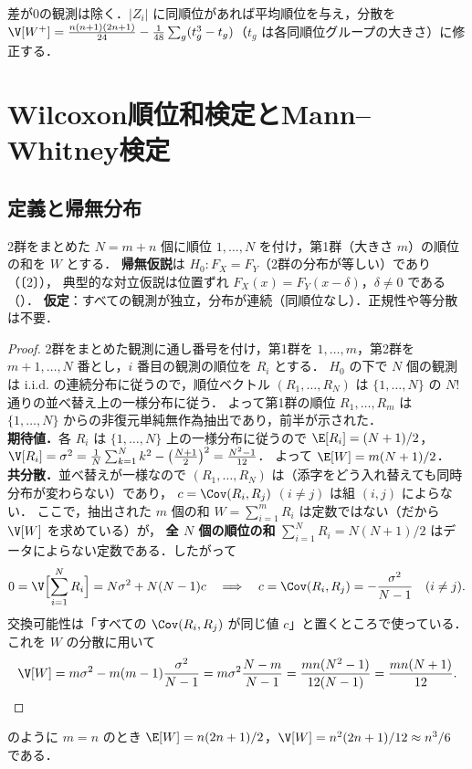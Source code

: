 \begin{supbox}
差が0の観測は除く．$|Z_i|$ に同順位があれば平均順位を与え，分散を
$\V[W^+]=\frac{n(n+1)(2n+1)}{24}-\frac{1}{48}\sum_g(t_g^3-t_g)$（$t_g$ は各同順位グループの大きさ）に修正する．
\end{supbox}

\section{Wilcoxon順位和検定とMann--Whitney検定}\label{sec:03-ranksum}
\subsection{定義と帰無分布}
\Hissu\Hinshutsu 2群をまとめた $N=m+n$ 個に順位 $1,\dots,N$ を付け，第1群（大きさ $m$）の順位の和を $W$ とする．
\textbf{帰無仮説}は $H_0:F_X=F_Y$（2群の分布が等しい）であり（〔2〕），
典型的な対立仮説は位置ずれ $F_X(x)=F_Y(x-\delta)$，$\delta\ne0$ である（）．
\textbf{仮定}：すべての観測が独立，分布が連続（同順位なし）．正規性や等分散は不要．

\begin{proof}
2群をまとめた観測に通し番号を付け，第1群を $1,\dots,m$，第2群を $m+1,\dots,N$ 番とし，$i$ 番目の観測の順位を $R_i$ とする．
$H_0$ の下で $N$ 個の観測は i.i.d. の連続分布に従うので，順位ベクトル $(R_1,\dots,R_N)$ は $\{1,\dots,N\}$ の $N!$ 通りの並べ替え上の一様分布に従う．
よって第1群の順位 $R_1,\dots,R_m$ は $\{1,\dots,N\}$ からの非復元単純無作為抽出であり，前半が示された．\\
\textbf{期待値．}各 $R_i$ は $\{1,\dots,N\}$ 上の一様分布に従うので $\E[R_i]=(N+1)/2$，$\V[R_i]=\sigma^2=\frac1N\sum_{k=1}^N k^2-\bigl(\frac{N+1}2\bigr)^2=\frac{N^2-1}{12}$．
よって $\E[W]=m(N+1)/2$．\\
\textbf{共分散．}並べ替えが一様なので $(R_1,\dots,R_N)$ は（添字をどう入れ替えても同時分布が変わらない）であり，
$c=\Cov(R_i,R_j)$ $(i\ne j)$ は組 $(i,j)$ によらない．
ここで，抽出された $m$ 個の和 $W=\sum_{i=1}^mR_i$ は定数ではない（だから $\V[W]$ を求めている）が，
\textbf{全 $N$ 個の順位の和} $\sum_{i=1}^NR_i=N(N+1)/2$ はデータによらない定数である．したがって
\[
0=\V\Bigl[\sum_{i=1}^NR_i\Bigr]=N\sigma^2+N(N-1)c\quad\Longrightarrow\quad c=\Cov(R_i,R_j)=-\frac{\sigma^2}{N-1}\quad(i\ne j).
\]
交換可能性は「すべての $\Cov(R_i,R_j)$ が同じ値 $c$」と置くところで使っている．これを $W$ の分散に用いて
\[
\V[W]=m\sigma^2-m(m-1)\frac{\sigma^2}{N-1}=m\sigma^2\frac{N-m}{N-1}=\frac{m n(N^2-1)}{12(N-1)}=\frac{mn(N+1)}{12}.
\]
\end{proof}
 のように $m=n$ のとき $\E[W]=n(2n+1)/2$，$\V[W]=n^2(2n+1)/12\approx n^3/6$ である．

